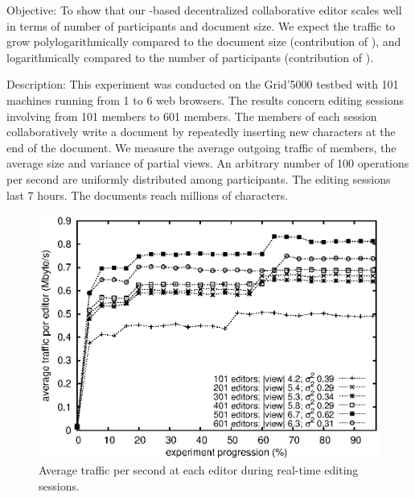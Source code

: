 \begin{asparadesc}
\item [Objective:] To show that our \LSEQ-based decentralized collaborative
  editor scales well in terms of number of participants and document size. We
  expect the traffic to grow polylogarithmically compared to the document size
  (contribution of \LSEQ), and logarithmically compared to the number of
  participants (contribution of \SPRAY).
\item [Description:] This experiment was conducted on the Grid'5000 testbed with
  101 machines running from 1 to 6 web browsers. The results concern editing
  sessions involving from 101 members to 601 members. The members of each
  session collaboratively write a document by repeatedly inserting new
  characters at the end of the document. We measure the average outgoing traffic
  of members, the average size and variance of partial views. An arbitrary
  number of 100 operations per second are uniformly distributed among
  participants. The editing sessions last 7 hours. The documents reach millions
  of characters.

\begin{figure}
  \centering
  \includegraphics[width=\columnwidth]{./img/communication.eps}
  \caption{\label{fig:traffic} Average traffic per second at each editor during
    real-time editing sessions.}
\end{figure}


\end{asparadesc}
